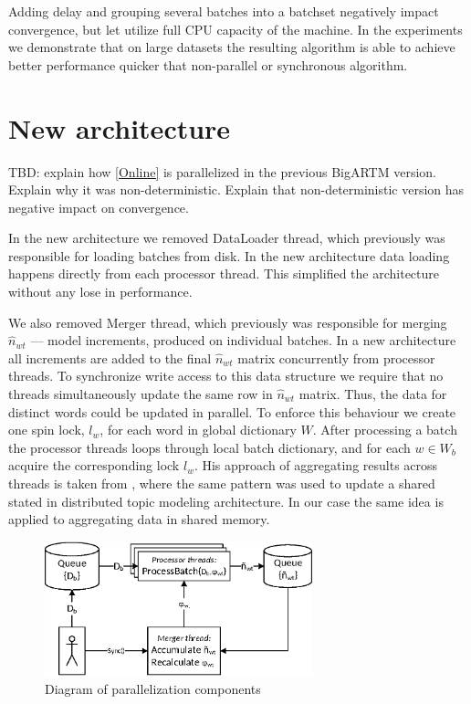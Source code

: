 \documentclass[russian,english]{llncs}
\begin{document}
Adding delay and grouping several batches into a batchset negatively impact convergence,
but let utilize full CPU capacity of the machine.
In the experiments we demonstrate that on large datasets the resulting algorithm
is able to achieve better performance quicker that non-parallel or synchronous algorithm.

\section{New architecture}
\label{sec:Architecture}

TBD: explain how \ref{Online} is parallelized in the previous BigARTM version.
Explain why it was non-deterministic.
Explain that non-deterministic version has negative impact on convergence.

In the new architecture we removed DataLoader thread,
which previously was responsible for loading batches from disk.
In the new architecture data loading happens directly from each processor thread.
This simplified the architecture without any lose in performance.

We also removed Merger thread, which previously was responsible
for merging $\hat n_{wt}$ --- model increments, produced on individual batches.
In a new architecture all increments are added to the final $\hat n_{wt}$ matrix
concurrently from processor threads.
To synchronize write access to this data structure we require that
no threads simultaneously update the same row in $\hat n_{wt}$ matrix.
Thus, the data for distinct words could be updated in parallel.
To enforce this behaviour we create one spin lock, $l_w$, for each word in global dictionary $W$.
After processing a batch the processor threads loops through local batch dictionary,
and for each $w \in W_b$ acquire the corresponding lock $l_w$.
His approach of aggregating results across threads is taken from \cite{smola10architecture},
where the same pattern was used to update a shared stated in distributed topic modeling architecture.
In our case the same idea is applied to aggregating data in shared memory.

\begin{figure}[t]
\begin{centering}
\includegraphics[height=39mm]{diagramm_artm_core.eps}
\caption{Diagram of parallelization components}
\label{fig:diagramm_artm_core}
\end{centering}
\end{figure}
\end{document}
